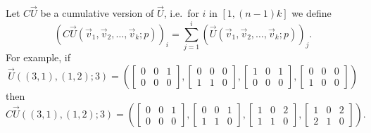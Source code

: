 \documentclass{article}
\begin{document}
\label{def:CU}Let $C\vec U$ be a cumulative version of $\vec U$, i.e.~for $i$ in $[1,(n-1)k]$ we define
$$\left( C\vec U(\vec v_1, \vec v_2, \ldots, \vec v_k; p)\right)_i
=
\sum_{j=1}^{i}\left(
\vec U(\vec v_1, \vec v_2, \ldots, \vec v_k; p) \right)_j.
$$
For example, if
$$\vec U((3,1), (1,2); 3) = \left(
\begin{bmatrix}
0 & 0 & 1 \\
0 & 0 & 0
\end{bmatrix},
\begin{bmatrix}
0 & 0 & 0 \\
1 & 1 & 0 
\end{bmatrix},
\begin{bmatrix}
1 & 0 & 1 \\
0 & 0 & 0
\end{bmatrix},
\begin{bmatrix}
0 & 0 & 0 \\
1 & 0 & 0
\end{bmatrix}
\right)$$
then
$$C\vec U((3,1), (1,2); 3) = \left(
\begin{bmatrix}
0 & 0 & 1 \\
0 & 0 & 0
\end{bmatrix},
\begin{bmatrix}
0 & 0 & 1 \\
1 & 1 & 0 
\end{bmatrix},
\begin{bmatrix}
1 & 0 & 2 \\
1 & 1 & 0
\end{bmatrix},
\begin{bmatrix}
1 & 0 & 2 \\
2 & 1 & 0
\end{bmatrix}
\right).$$
\end{document}
